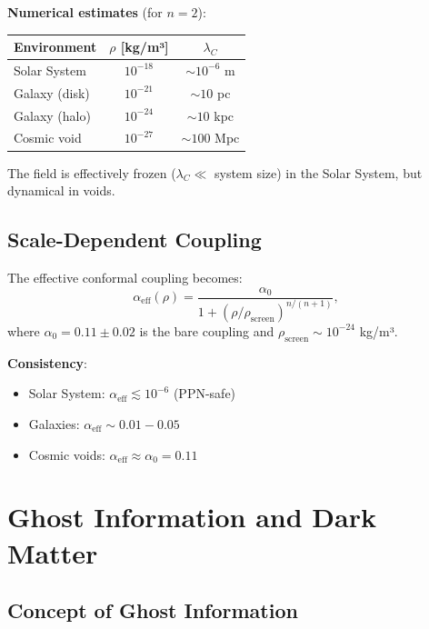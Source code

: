 \documentclass[12pt, a4paper]{article}
\begin{document}
\textbf{Numerical estimates} (for $n=2$):
\begin{center}
\begin{tabular}{lcc}
\toprule
Environment & $\rho$ [kg/m³] & $\lambda_C$ \\
\midrule
Solar System & $10^{-18}$ & $\sim 10^{-6}$ m \\
Galaxy (disk) & $10^{-21}$ & $\sim 10$ pc \\
Galaxy (halo) & $10^{-24}$ & $\sim 10$ kpc \\
Cosmic void & $10^{-27}$ & $\sim 100$ Mpc \\
\bottomrule
\end{tabular}
\end{center}

The field is effectively frozen ($\lambda_C \ll$ system size) in the Solar System, but dynamical in voids.

\subsection{Scale-Dependent Coupling}

The effective conformal coupling becomes:
\begin{equation}
    \alpha_{\text{eff}}(\rho) = \frac{\alpha_0}{1 + (\rho/\rho_{\text{screen}})^{n/(n+1)}},
    \label{eq:alpha_eff}
\end{equation}
where $\alpha_0 = 0.11 \pm 0.02$ is the bare coupling and $\rho_{\text{screen}} \sim 10^{-24}$ kg/m³.

\textbf{Consistency}:
\begin{itemize}
    \item Solar System: $\alpha_{\text{eff}} \lesssim 10^{-6}$ (PPN-safe)
    \item Galaxies: $\alpha_{\text{eff}} \sim 0.01 - 0.05$
    \item Cosmic voids: $\alpha_{\text{eff}} \approx \alpha_0 = 0.11$
\end{itemize}


\section{Ghost Information and Dark Matter}

\subsection{Concept of Ghost Information}
\end{document}
